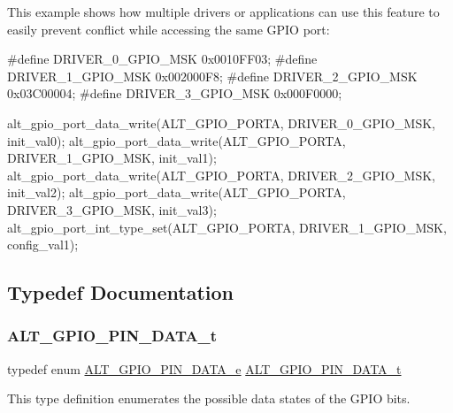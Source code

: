 This example shows how multiple drivers or applications can use this feature to easily prevent conflict while accessing the same G\+P\+IO port\+: \begin{DoxyVerb}#define DRIVER_0_GPIO_MSK   0x0010FF03;
#define DRIVER_1_GPIO_MSK   0x002000F8;
#define DRIVER_2_GPIO_MSK   0x03C00004;
#define DRIVER_3_GPIO_MSK   0x000F0000;

   alt_gpio_port_data_write(ALT_GPIO_PORTA, DRIVER_0_GPIO_MSK, init_val0);
   alt_gpio_port_data_write(ALT_GPIO_PORTA, DRIVER_1_GPIO_MSK, init_val1);
   alt_gpio_port_data_write(ALT_GPIO_PORTA, DRIVER_2_GPIO_MSK, init_val2);
   alt_gpio_port_data_write(ALT_GPIO_PORTA, DRIVER_3_GPIO_MSK, init_val3);
   alt_gpio_port_int_type_set(ALT_GPIO_PORTA, DRIVER_1_GPIO_MSK, config_val1);
\end{DoxyVerb}
 

\subsection{Typedef Documentation}
\mbox{\label{group__ALT__GPIO__API__CONFIG_ga757cd8797c8bb2ed86d75d961ce9041b}} 
\subsubsection{\texorpdfstring{ALT\_GPIO\_PIN\_DATA\_t}{ALT\_GPIO\_PIN\_DATA\_t}}
{\footnotesize\ttfamily typedef enum \mbox{\hyperlink{group__ALT__GPIO__API__CONFIG_gac392f6d8108c038acc4ab0b1533c2eef}{A\+L\+T\+\_\+\+G\+P\+I\+O\+\_\+\+P\+I\+N\+\_\+\+D\+A\+T\+A\+\_\+e}}  \mbox{\hyperlink{group__ALT__GPIO__API__CONFIG_ga757cd8797c8bb2ed86d75d961ce9041b}{A\+L\+T\+\_\+\+G\+P\+I\+O\+\_\+\+P\+I\+N\+\_\+\+D\+A\+T\+A\+\_\+t}}}

This type definition enumerates the possible data states of the G\+P\+IO bits. \mbox{\label{group__ALT__GPIO__API__CONFIG_gac48653c26697d3fd17d9029252655ac2}} 
